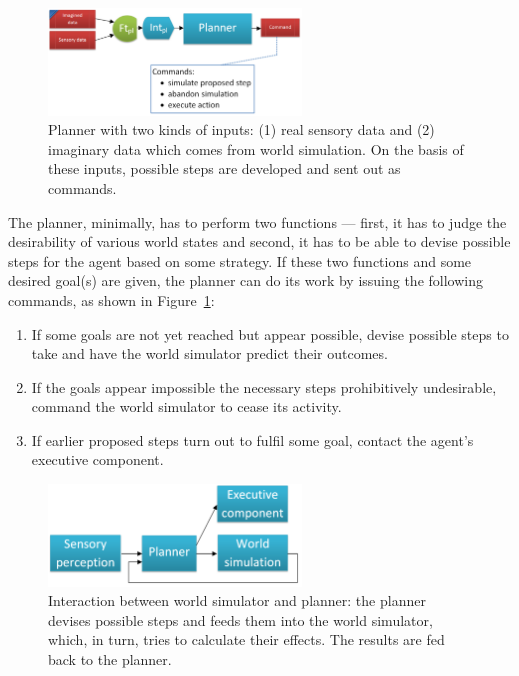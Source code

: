 \begin{figure}[t]
	\centering
	\includegraphics[width=0.6\textwidth]{Figs/planner.png}
	\caption{Planner with two kinds of inputs: (1) real sensory data and (2) imaginary data which comes from world simulation. On the basis of these inputs, possible steps are developed and sent out as commands.}
	\label{fig:planner}
\end{figure}

The planner, minimally, has to perform two functions --- first, it has to judge the desirability of various world states and second, it has to be able to devise possible steps for the agent based on some strategy. If these two functions and some desired goal(s) are given, the planner can do its work by issuing the following commands, as shown in Figure~\ref{fig:planner}:
\begin{enumerate}
	\item If some goals are not yet reached but appear possible, devise possible steps to take and have the world simulator predict their outcomes.
	\item If the goals appear impossible the necessary steps prohibitively undesirable, command the world simulator to cease its activity.
	\item If earlier proposed steps turn out to fulfil some goal, contact the agent's executive component.
\end{enumerate}

\begin{figure}[t]
	\centering
	\includegraphics[width=0.6\textwidth]{Figs/worldSimulatorPlannerInteraction.png}
	\caption{Interaction between world simulator and planner: the planner devises possible steps and feeds them into the world simulator, which, in turn, tries to calculate their effects. The results are fed back to the planner.}
	\label{fig:worldSimulatorPlannerInteraction}
\end{figure}

